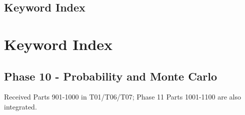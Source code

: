 \hypertarget{appendix-a6d556a4ef50}{}
\section*{Keyword Index}
\chapter{Keyword Index}\label{appendix-a6d556a4ef50-keyword-index}

\section{Phase 10 - Probability and Monte Carlo}\label{appendix-a6d556a4ef50-phase-10---probability-and-monte-carlo}

Received Parts 901-1000 in T01/T06/T07; Phase 11 Parts 1001-1100 are also integrated.

